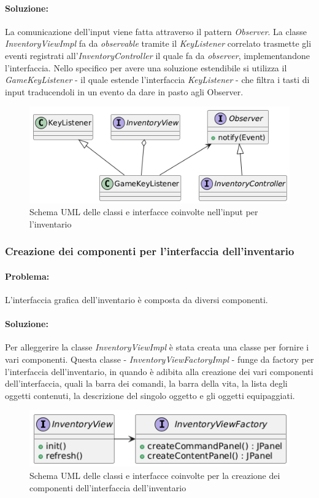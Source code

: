 \documentclass[a4paper,12pt]{report}
\begin{document}
\paragraph{Soluzione:} La comunicazione dell'input viene fatta attraverso il pattern \textit{Observer}. La classe \textit{InventoryViewImpl} fa da \textit{observable} tramite il 
\textit{KeyListener} correlato trasmette gli eventi registrati all'\textit{InventoryController} il quale fa da \textit{observer}, implementandone l'interfaccia.
Nello specifico per avere una soluzione estendibile si utilizza il \textit{GameKeyListener} - il quale estende l'interfaccia \textit{KeyListener} - che filtra i tasti di input 
traducendoli in un evento da dare in pasto agli Observer. 
\begin{figure}[H]
	\centering{}
	\includegraphics[width=\textwidth]{img/lorenzo/observer-inventory.png}
	\caption{Schema UML delle classi e interfacce coinvolte nell'input per l'inventario}
	\label{img:template}
\end{figure}

\subsubsection{Creazione dei componenti per l'interfaccia dell'inventario}
\paragraph{Problema:} L'interfaccia grafica dell'inventario è composta da diversi componenti.
\paragraph{Soluzione:} Per alleggerire la classe \textit{InventoryViewImpl} è stata creata una classe per fornire i vari componenti. Questa classe - \textit{InventoryViewFactoryImpl} -
funge da factory per l'interfaccia dell'inventario, in quando è adibita alla creazione dei vari componenti dell'interfaccia, quali la barra dei comandi, la barra della vita,
la lista degli oggetti contenuti, la descrizione del singolo oggetto e gli oggetti equipaggiati.
\begin{figure}[H]
	\centering{}
	\includegraphics[width=\textwidth]{img/lorenzo/inventory-factory.png}
	\caption{Schema UML delle classi e interfacce coinvolte per la creazione dei componenti dell'interfaccia dell'inventario}
	\label{img:template}
\end{figure}
\end{document}
